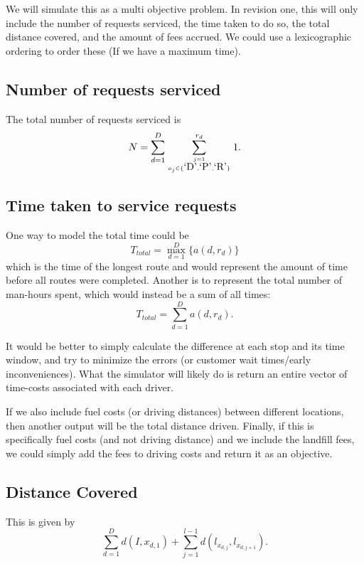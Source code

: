 \documentclass{article}
\begin{document}
We will simulate this as a multi objective problem.
In revision one, this will only include the number of requests serviced, the time taken to do so, the total distance covered, and the amount of fees accrued.
We could use a lexicographic ordering to order these (If we have a maximum time).

\subsection{Number of requests serviced}

The total number of requests serviced is 
$$N = \sum_{d=1} ^D \sum_{j=1\atop o_j \in \{\mbox{`D'},\mbox{`P'}, \mbox{`R'}\}}^{r_d} 1.$$

\subsection{Time taken to service requests}

One way to model the total time could be
$$ T_{total} = \max_{d=1} ^D \{ a(d, r_d) \} $$ which is the time of the longest route and would represent the amount of time before all routes were completed.
Another is to represent the total number of man-hours spent, which would instead be a sum of all times:
$$ T_{total} = \sum_{d=1} ^D  a(d, r_d)  .$$

It would be better to simply calculate the difference at each stop and its time window, 
and try to minimize the errors (or customer wait times/early inconveniences).
What the simulator will likely do is return an entire vector of time-costs associated with each driver.

If we also include fuel costs (or driving distances) between different locations, then another output will be the total distance driven.
Finally, if this is specifically fuel costs (and not driving distance) and we include the landfill fees, we could simply add the fees to driving costs and return it as an objective.

\subsection{Distance Covered}
This is given by
$$\sum_{d=1}^D d(I, x_{d, 1}) + \sum_{j=1}^{l-1} d(l_{x_{d,j}},l_{x_{d,j+1}} ).$$
\end{document}
